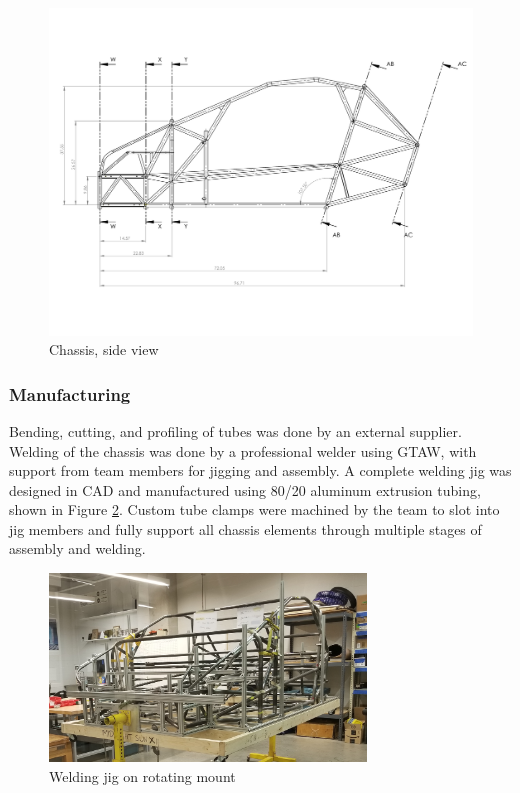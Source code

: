 \documentclass[10pt]{article}
\begin{document}
\begin{figure}
\centering
\includegraphics[width=\textwidth]{figures/chassis-side}
\caption{Chassis, side view}
\label{fig:chassis-side}
\end{figure}

\subsubsection{Manufacturing}
Bending, cutting, and profiling of tubes was done by an external supplier. Welding of the chassis was done by a professional welder using GTAW, with support from team members for jigging and assembly. A complete welding jig was designed in CAD and manufactured using 80/20 aluminum extrusion tubing, shown in Figure \ref{fig:welding-jig}. Custom tube clamps were machined by the team to slot into jig members and fully support all chassis elements through multiple stages of assembly and welding.

\begin{figure}
\centering
\includegraphics[width=0.75\textwidth]{figures/welding-jig}
\caption{Welding jig on rotating mount}
\label{fig:welding-jig}
\end{figure}
\end{document}
